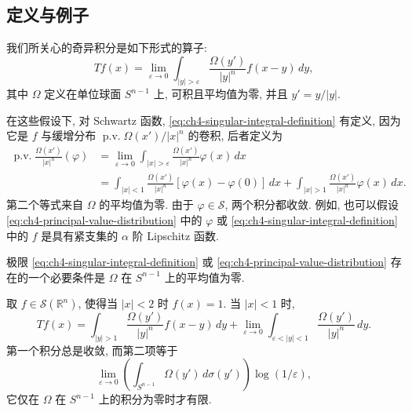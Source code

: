 \hypertarget{chapter-04-page-081}{}
\subsection{定义与例子}
\label{sec:ch4-definition-examples}

我们所关心的奇异积分是如下形式的算子:
\begin{equation}
\label{eq:ch4-singular-integral-definition}
 Tf(x)=\lim_{\varepsilon\to0}\int_{|y|>\varepsilon}
 \frac{\Omega(y')}{|y|^n}f(x-y)\,dy,
\end{equation}
其中 $\Omega$ 定义在单位球面 $S^{n-1}$ 上, 可积且平均值为零, 并且 $y'=y/|y|$.

在这些假设下, 对 Schwartz 函数, \eqref{eq:ch4-singular-integral-definition} 有定义, 因为它是 $f$ 与缓增分布 $\operatorname{p.v.}\Omega(x')/|x|^n$ 的卷积, 后者定义为
\begin{equation}
\label{eq:ch4-principal-value-distribution}
\begin{aligned}
 \operatorname{p.v.}\frac{\Omega(x')}{|x|^n}(\varphi)
 &=\lim_{\varepsilon\to0}\int_{|x|>\varepsilon}
   \frac{\Omega(x')}{|x|^n}\varphi(x)\,dx\\
 &=\int_{|x|<1}\frac{\Omega(x')}{|x|^n}
   [\varphi(x)-\varphi(0)]\,dx
   +\int_{|x|>1}\frac{\Omega(x')}{|x|^n}\varphi(x)\,dx.
\end{aligned}
\end{equation}
第二个等式来自 $\Omega$ 的平均值为零. 由于 $\varphi\in\mathcal S$, 两个积分都收敛. 例如, 也可以假设 \eqref{eq:ch4-principal-value-distribution} 中的 $\varphi$ 或 \eqref{eq:ch4-singular-integral-definition} 中的 $f$ 是具有紧支集的 $\alpha$ 阶 Lipschitz 函数.

\begin{Proposition}
\label{prop:ch4-zero-mean-necessary}
极限 \eqref{eq:ch4-singular-integral-definition} 或 \eqref{eq:ch4-principal-value-distribution} 存在的一个必要条件是 $\Omega$ 在 $S^{n-1}$ 上的平均值为零.
\end{Proposition}

\begin{Proof}
取 $f\in\mathcal S(\mathbb R^n)$, 使得当 $|x|<2$ 时 $f(x)=1$. 当 $|x|<1$ 时,
\[
 Tf(x)=\int_{|y|>1}\frac{\Omega(y')}{|y|^n}f(x-y)\,dy
 +\lim_{\varepsilon\to0}\int_{\varepsilon<|y|<1}
 \frac{\Omega(y')}{|y|^n}\,dy.
\]
第一个积分总是收敛, 而第二项等于
\[
 \lim_{\varepsilon\to0}
 \left(\int_{S^{n-1}}\Omega(y')\,d\sigma(y')\right)
 \log(1/\varepsilon),
\]
它仅在 $\Omega$ 在 $S^{n-1}$ 上的积分为零时才有限.
\end{Proof}

